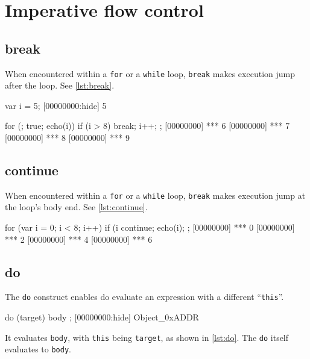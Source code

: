 \FloatBarrier
\section{Imperative flow control}

\subsection{break}

When encountered within a \lstinline|for| or a \lstinline|while| loop,
\lstinline|break| makes execution jump after the loop. See
\autoref{lst:break}.

\begin{urbiscript}[caption=Using break, label=lst:break,
  float=\floatpos]
var i = 5;
[00000000:hide] 5

for (; true; echo(i))
{
  if (i > 8)
    break;
  i++;
};
[00000000] *** 6
[00000000] *** 7
[00000000] *** 8
[00000000] *** 9
\end{urbiscript}

\subsection{continue}

When encountered within a \lstinline|for| or a \lstinline|while| loop,
\lstinline|break| makes execution jump at the loop's body end. See
\autoref{lst:continue}.

\begin{urbiscript}[caption=Using continue, label=lst:continue,
  float=\floatpos]
for (var i = 0; i < 8; i++)
{
  if (i %
    continue;
  echo(i);
};
[00000000] *** 0
[00000000] *** 2
[00000000] *** 4
[00000000] *** 6
\end{urbiscript}

\subsection{do}

The \lstinline|do| construct enables do evaluate an expression with a
different ``\lstinline|this|''.

\begin{urbiscript}[frame=, backgroundcolor=, ]
do (target)
{
  body
};
[00000000:hide] Object_0xADDR

\end{urbiscript}

It evaluates \lstinline|body|, with \lstinline|this| being
\lstinline|target|, as shown in \autoref{lst:do}.  The \lstinline|do| itself
evaluates to \lstinline|body|.


